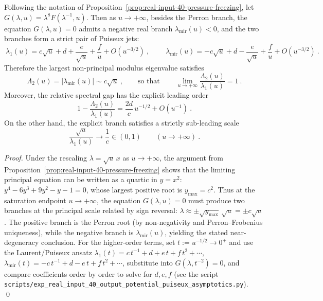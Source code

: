 \begin{proposition}\label{prop:real-input-40-output-mirror-branch}
Following the notation of Proposition~\ref{prop:real-input-40-pressure-freezing}, let \(G(\lambda,u)=\lambda^8F(\lambda^{-1},u)\).
Then as \(u\to+\infty\), besides the Perron branch, the equation \(G(\lambda,u)=0\) admits a negative real branch \(\lambda_{\mathrm{mir}}(u)<0\), and the two branches form a strict pair of Puiseux jets:
\[
\boxed{\ \lambda_1(u)=c\sqrt u+d+\frac{e}{\sqrt u}+\frac{f}{u}+O\!\left(u^{-3/2}\right)\ },
\qquad
\boxed{\ \lambda_{\mathrm{mir}}(u)=-c\sqrt u+d-\frac{e}{\sqrt u}+\frac{f}{u}+O\!\left(u^{-3/2}\right)\ }.
\]
Therefore the largest non-principal modulus eigenvalue satisfies
\[
\boxed{\ \Lambda_2(u)=|\lambda_{\mathrm{mir}}(u)|\sim c\sqrt u\ },
\qquad\text{so that}\qquad
\boxed{\ \lim_{u\to+\infty}\frac{\Lambda_2(u)}{\lambda_1(u)}=1\ }.
\]
Moreover, the relative spectral gap has the explicit leading order
\[
\boxed{\ 1-\frac{\Lambda_2(u)}{\lambda_1(u)}=\frac{2d}{c}\,u^{-1/2}+O(u^{-1})\ }.
\]
On the other hand, the explicit branch satisfies a strictly sub-leading scale
\[
\boxed{\ \frac{\sqrt u}{\lambda_1(u)}\longrightarrow \frac{1}{c}\in(0,1)\qquad(u\to+\infty)\ }.
\]
\end{proposition}
\begin{proof}
Under the rescaling \(\lambda=\sqrt u\,x\) as \(u\to+\infty\), the argument from Proposition~\ref{prop:real-input-40-pressure-freezing} shows that the limiting principal equation can be written as a quartic in \(y=x^2\):
\(
y^4-6y^3+9y^2-y-1=0
\),
whose largest positive root is \(y_{\max}=c^2\).
Thus at the saturation endpoint \(u\to+\infty\), the equation \(G(\lambda,u)=0\) must produce two branches at the principal scale related by sign reversal:
\(
\lambda\approx \pm\sqrt{y_{\max}}\,\sqrt u=\pm c\sqrt u
\).
The positive branch is the Perron root (by non-negativity and Perron--Frobenius uniqueness), while the negative branch is \(\lambda_{\mathrm{mir}}(u)\), yielding the stated near-degeneracy conclusion.
For the higher-order terms, set \(t:=u^{-1/2}\to 0^+\) and use the Laurent/Puiseux ansatz
\(\lambda_1(t)=c\,t^{-1}+d+e\,t+f\,t^2+\cdots\), \(\lambda_{\mathrm{mir}}(t)=-c\,t^{-1}+d-e\,t+f\,t^2+\cdots\), substitute into \(G(\lambda,t^{-2})=0\), and compare coefficients order by order to solve for \(d,e,f\) (see the script \texttt{scripts/exp\_real\_input\_40\_output\_potential\_puiseux\_asymptotics.py}). \qed
\end{proof}

